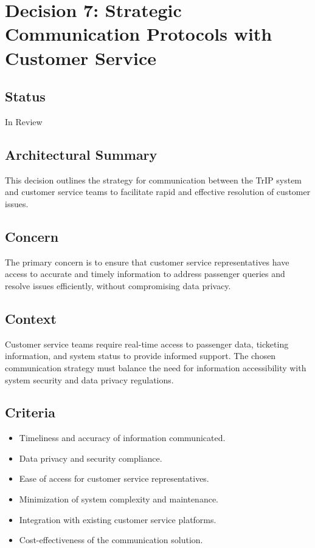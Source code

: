 \section*{Decision 7: Strategic Communication Protocols with Customer Service}

\subsection*{Status}
In Review

\subsection*{Architectural Summary}
This decision outlines the strategy for communication between the TrIP system and customer service teams to facilitate rapid and effective resolution of customer issues.

\subsection*{Concern}
The primary concern is to ensure that customer service representatives have access to accurate and timely information to address passenger queries and resolve issues efficiently, without compromising data privacy.

\subsection*{Context}
Customer service teams require real-time access to passenger data, ticketing information, and system status to provide informed support. The chosen communication strategy must balance the need for information accessibility with system security and data privacy regulations.

\subsection*{Criteria}
\begin{itemize}
    \item Timeliness and accuracy of information communicated.
    \item Data privacy and security compliance.
    \item Ease of access for customer service representatives.
    \item Minimization of system complexity and maintenance.
    \item Integration with existing customer service platforms.
    \item Cost-effectiveness of the communication solution.
\end{itemize}

